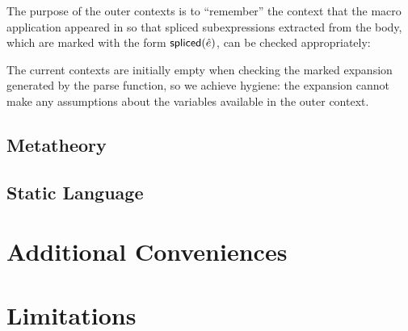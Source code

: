 {\begin{enumerate}
\begin{mathpar}

\end{mathpar}

The purpose of the outer contexts is to ``remember'' the context that the macro application appeared in so that spliced subexpressions extracted from the body, which are marked with the form $\mathsf{spliced}(\ue)$, can be checked appropriately:
\begin{mathpar}
\end{mathpar}

The current contexts are initially empty when checking the marked expansion generated by the parse function, so we achieve hygiene: the expansion cannot make any assumptions about the variables available in the outer context. 
\end{enumerate}

\subsection{Metatheory}
\subsection{Static Language}\label{sec:static-subset}
\section{Additional Conveniences}
\section{Limitations}
}
